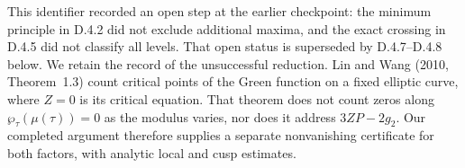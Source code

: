 \begin{remark}[D.4.6; Known]
This identifier recorded an open step at the earlier checkpoint:
the minimum principle in D.4.2 did not exclude additional maxima,
and the exact crossing in D.4.5 did not classify all levels. That
open status is superseded by D.4.7--D.4.8 below. We retain the
record of the unsuccessful reduction. Lin and Wang (2010,
Theorem~1.3) count critical points of the Green function on a fixed
elliptic curve, where \(Z=0\) is its critical equation. That theorem
does not count zeros along \(\wp_\tau(\mu(\tau))=0\) as the modulus
varies, nor does it address \(3ZP-2g_2\). Our completed argument
therefore supplies a separate nonvanishing certificate for both
factors, with analytic local and cusp estimates.
\end{remark}



